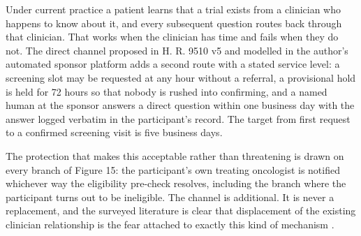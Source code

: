 Under current practice a patient learns that a trial exists from a clinician who
happens to know about it, and every subsequent question routes back through that
clinician. That works when the clinician has time and fails when they do not.
The direct channel proposed in H. R. 9510 v5 \cite{hr9510billv5} and modelled in
the author's automated sponsor platform \cite{paiautospons} adds a second route
with a stated service level: a screening slot may be requested at any hour
without a referral, a provisional hold is held for 72 hours so that nobody is
rushed into confirming, and a named human at the sponsor answers a direct
question within one business day with the answer logged verbatim in the
participant's record. The target from first request to a confirmed screening
visit is five business days.

The protection that makes this acceptable rather than threatening is drawn on
every branch of Figure 15: the participant's own treating oncologist is notified
whichever way the eligibility pre-check resolves, including the branch where the
participant turns out to be ineligible. The channel is additional. It is never a
replacement, and the surveyed literature is clear that displacement of the
existing clinician relationship is the fear attached to exactly this kind of
mechanism \cite{WuSemiAI2026, TelesAI2026A}.

